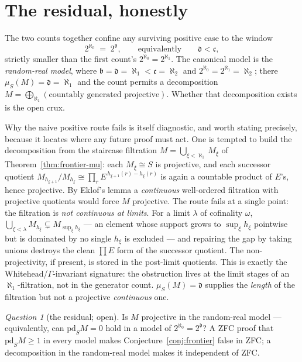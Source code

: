 \documentclass[11pt]{report}
\theoremstyle{plain}
\theoremstyle{definition}
\theoremstyle{remark}
\newcommand{\dd}{\mathfrak{d}}
\newcommand{\cont}{\mathfrak{c}}
\newcommand{\pd}{\mathrm{pd}}
\newcommand{\bb}{\mathfrak{b}}
\newtheorem{question}[theorem]{Question}
\begin{document}
\section{The residual, honestly}\label{sec:frontier-residual}

The two counts together confine any surviving positive case to the window
\[
   2^{\aleph_0} \;=\; 2^{\dd}, \qquad\text{equivalently}\qquad \dd<\cont ,
\]
strictly smaller than the first count's $2^{\aleph_0}=2^{\aleph_1}$. The
canonical model is the \emph{random-real model}, where
$\bb=\dd=\aleph_1<\cont=\aleph_2$ and $2^{\aleph_0}=2^{\aleph_1}=\aleph_2$; there
$\mu_S(M)=\dd=\aleph_1$ and the count permits a decomposition
$M=\bigoplus_{\aleph_1}(\text{countably generated projective})$. Whether that
decomposition exists is the open crux.

Why the naive positive route fails is itself diagnostic, and worth stating
precisely, because it locates where any future proof must act. One is tempted to
build the decomposition from the staircase filtration $M=\bigcup_{\xi<\aleph_1}
M_\xi$ of Theorem~\ref{thm:frontier-mu}: each $M_\xi\cong S$ is projective, and
each successor quotient $M_{h_{\xi+1}}/M_{h_\xi}\cong\prod_r
E^{\,h_{\xi+1}(r)-h_\xi(r)}$ is again a countable product of $E$'s, hence
projective. By Eklof's lemma a \emph{continuous} well-ordered filtration with
projective quotients would force $M$ projective. The route fails at a single
point: the filtration is \emph{not continuous at limits}. For a limit $\lambda$
of cofinality $\omega$, $\bigcup_{\xi<\lambda}M_{h_\xi}\subsetneq
M_{\sup_\xi h_\xi}$ --- an element whose support grows to $\sup_\xi h_\xi$
pointwise but is dominated by no single $h_\xi$ is excluded --- and repairing the
gap by taking unions destroys the clean $\prod E$ form of the successor quotient.
The non-projectivity, if present, is stored in the post-limit quotients. This is
exactly the Whitehead/$\Gamma$-invariant signature: the obstruction lives at the
limit stages of an $\aleph_1$-filtration, not in the generator count.
$\mu_S(M)=\dd$ supplies the \emph{length} of the filtration but not a projective
\emph{continuous} one.

\begin{question}[the residual; open]\label{q:frontier}
Is $M$ projective in the random-real model --- equivalently, can
$\pd_S M=0$ hold in a model of $2^{\aleph_0}=2^{\dd}$? A ZFC proof that
$\pd_S M\ge1$ in every model makes Conjecture~\ref{conj:frontier} false in ZFC;
a decomposition in the random-real model makes it independent of ZFC.
\end{question}
\end{document}
